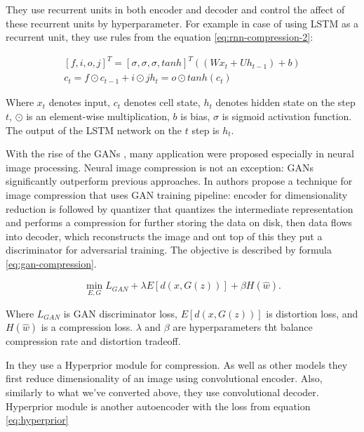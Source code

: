 They use recurrent units in both encoder and decoder and control the affect of these recurrent units by hyperparameter. For example in case of using LSTM as a recurrent unit, they use rules from the equation \ref{eq:rnn-compression-2}:

\begin{equation}
    \label{eq:rnn-compression-2}
    \begin{split}
        [f, i, o, j]^T = [\sigma, \sigma, \sigma, tanh]^T((W x_t + U h_{t-1}) + b) \\
        c_t = f \odot c_{t-1} + i \odot j
        h_t = o \odot tanh(c_t)
    \end{split}
\end{equation}

Where $x_t$ denotes input, $c_t$ denotes cell state, $h_t$ denotes hidden state on the step $t$, $\odot$ is an element-wise multiplication, $b$ is bias, $\sigma$ is sigmoid activation function. The output of the LSTM network on the $t$ step is $h_t$.

With the rise of the GANs \cite{Goodfellow_Pouget-Abadie_Mirza_Xu_Warde-Farley_Ozair_Courville_Bengio_2014}, many application were proposed especially in neural image processing. Neural image compression is not an exception: GANs significantly outperform previous approaches. In \cite{agustsson_generative_2019} authors propose a technique for image compression that uses GAN training pipeline: encoder for dimensionality reduction is followed by quantizer that quantizes the intermediate representation and performs a compression for further storing the data on disk, then data flows into decoder, which reconstructs the image and ont top of this they put a discriminator for adversarial training. The objective is described by formula \ref{eq:gan-compression}.

\begin{equation}
    \label{eq:gan-compression}
    \min_{E,G} L_{GAN} + \lambda E[d(x, G(z))] + \beta H(\hat{w}).
\end{equation}

Where $L_{GAN}$ is GAN discriminator loss, $E[d(x, G(z))]$ is distortion loss, and $H(\hat{w})$ is a compression loss. $\lambda$ and $\beta$ are hyperparameters tht balance compression rate and distortion tradeoff.

In \cite{balle_variational_2018, mentzer_high_fidelity_2020} they use a Hyperprior module for compression. As well as other models they first reduce dimensionality of an image using convolutional encoder. Also, similarly to what we've converted above, they use convolutional decoder. Hyperprior module is another autoencoder with the loss from equation \ref{eq:hyperprior}

